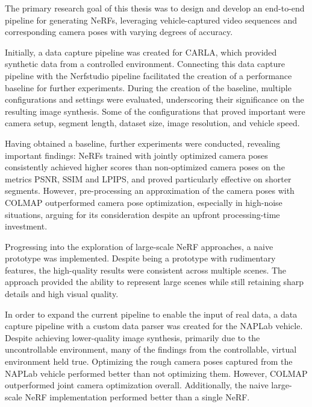 

The primary research goal of this thesis was to design and develop an end-to-end pipeline for generating NeRFs, leveraging vehicle-captured video sequences and corresponding camera poses with varying degrees of accuracy.

Initially, a data capture pipeline was created for CARLA, which provided synthetic data from a controlled environment. Connecting this data capture pipeline with the Nerfstudio pipeline facilitated the creation of a performance baseline for further experiments. During the creation of the baseline, multiple configurations and settings were evaluated, underscoring their significance on the resulting image synthesis. Some of the configurations that proved important were camera setup, segment length, dataset size, image resolution, and vehicle speed.

Having obtained a baseline, further experiments were conducted, revealing important findings: NeRFs trained with jointly optimized camera poses consistently achieved higher scores than non-optimized camera poses on the metrics PSNR, SSIM and LPIPS, and proved particularly effective on shorter segments. However, pre-processing an approximation of the camera poses with COLMAP outperformed camera pose optimization, especially in high-noise situations, arguing for its consideration despite an upfront processing-time investment.

Progressing into the exploration of large-scale NeRF approaches, a naive prototype was implemented. Despite being a prototype with rudimentary features, the high-quality results were consistent across multiple scenes. The approach provided the ability to represent large scenes while still retaining sharp details and high visual quality.

In order to expand the current pipeline to enable the input of real data, a data capture pipeline with a custom data parser was created for the NAPLab vehicle. Despite achieving lower-quality image synthesis, primarily due to the uncontrollable environment, many of the findings from the controllable, virtual environment held true. Optimizing the rough camera poses captured from the NAPLab vehicle performed better than not optimizing them. However, COLMAP outperformed joint camera optimization overall. Additionally, the naive large-scale NeRF implementation performed better than a single NeRF.

